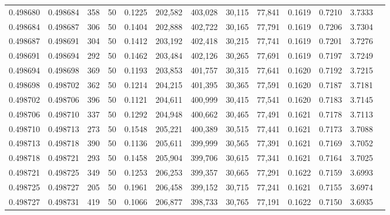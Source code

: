 \begin{tabular}{rrrrrrrrrrrrr}
0.498680 & 0.498684 & 358 &  50 &                                     0.1225 & 202,582 & 403,028 &  30,115 &  77,841 & 0.1619 & 0.7210 & 3.7333 \\
0.498684 & 0.498687 & 306 &  50 &                                     0.1404 & 202,888 & 402,722 &  30,165 &  77,791 & 0.1619 & 0.7206 & 3.7304 \\
0.498687 & 0.498691 & 304 &  50 &                                     0.1412 & 203,192 & 402,418 &  30,215 &  77,741 & 0.1619 & 0.7201 & 3.7276 \\
0.498691 & 0.498694 & 292 &  50 &                                     0.1462 & 203,484 & 402,126 &  30,265 &  77,691 & 0.1619 & 0.7197 & 3.7249 \\
0.498694 & 0.498698 & 369 &  50 &                                     0.1193 & 203,853 & 401,757 &  30,315 &  77,641 & 0.1620 & 0.7192 & 3.7215 \\
0.498698 & 0.498702 & 362 &  50 &                                     0.1214 & 204,215 & 401,395 &  30,365 &  77,591 & 0.1620 & 0.7187 & 3.7181 \\
0.498702 & 0.498706 & 396 &  50 &                                     0.1121 & 204,611 & 400,999 &  30,415 &  77,541 & 0.1620 & 0.7183 & 3.7145 \\
0.498706 & 0.498710 & 337 &  50 &                                     0.1292 & 204,948 & 400,662 &  30,465 &  77,491 & 0.1621 & 0.7178 & 3.7113 \\
0.498710 & 0.498713 & 273 &  50 &                                     0.1548 & 205,221 & 400,389 &  30,515 &  77,441 & 0.1621 & 0.7173 & 3.7088 \\
0.498713 & 0.498718 & 390 &  50 &                                     0.1136 & 205,611 & 399,999 &  30,565 &  77,391 & 0.1621 & 0.7169 & 3.7052 \\
0.498718 & 0.498721 & 293 &  50 &                                     0.1458 & 205,904 & 399,706 &  30,615 &  77,341 & 0.1621 & 0.7164 & 3.7025 \\
0.498721 & 0.498725 & 349 &  50 &                                     0.1253 & 206,253 & 399,357 &  30,665 &  77,291 & 0.1622 & 0.7159 & 3.6993 \\
0.498725 & 0.498727 & 205 &  50 &                                     0.1961 & 206,458 & 399,152 &  30,715 &  77,241 & 0.1621 & 0.7155 & 3.6974 \\
0.498727 & 0.498731 & 419 &  50 &                                     0.1066 & 206,877 & 398,733 &  30,765 &  77,191 & 0.1622 & 0.7150 & 3.6935 \\

\end{tabular}
